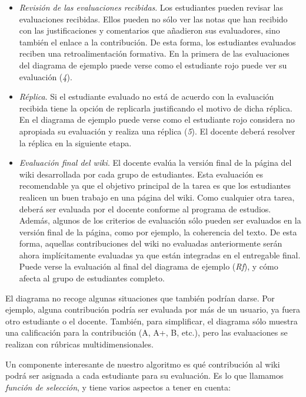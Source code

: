 \begin{itemize}
				\item \emph{Revisión de las evaluaciones recibidas}. Los estudiantes pueden revisar las evaluaciones recibidas. Ellos pueden no sólo ver las notas que han recibido con las justificaciones y comentarios que añadieron sus evaluadores, sino también el enlace a la contribución. De esta forma, los estudiantes evaluados reciben una retroalimentación formativa. En la primera de las evaluaciones del diagrama de ejemplo puede verse como el estudiante rojo puede ver su evaluación (\emph{4}).
				\item \emph{Réplica}. Si el estudiante evaluado no está de acuerdo con la evaluación recibida tiene la opción de replicarla justificando el motivo de dicha réplica. En el diagrama de ejemplo puede verse como el estudiante rojo considera no apropiada su evaluación y realiza una réplica (\emph{5}). El docente deberá resolver la réplica en la siguiente etapa.
				\item \emph{Evaluación final del wiki}. El docente evalúa la versión final de la página del wiki desarrollada por cada grupo de estudiantes. Esta evaluación es recomendable ya que el objetivo principal de la tarea es que los estudiantes realicen un buen trabajo en una página del wiki. Como cualquier otra tarea, deberá ser evaluada por el docente conforme al programa de estudios. Además, algunos de los criterios de evaluación sólo pueden ser evaluados en la versión final de la página, como por ejemplo, la coherencia del texto. De esta forma, aquellas contribuciones del wiki no evaluadas anteriormente serán ahora implícitamente evaluadas ya que están integradas en el entregable final. Puede verse la evaluación al final del diagrama de ejemplo (\emph{Rf}), y cómo afecta al grupo de estudiantes completo.
\end{itemize}

			El diagrama no recoge algunas situaciones que también podrían darse. Por ejemplo, alguna contribución podría ser evaluada por más de un usuario, ya fuera otro estudiante o el docente. También, para simplificar, el diagrama sólo muestra una calificación para la contribución (A, A+, B, etc.), pero las evaluaciones se realizan con rúbricas multidimensionales.

			Un componente interesante de nuestro algoritmo es qué contribución al wiki podrá ser asignada a cada estudiante para su evaluación. Es lo que llamamos \emph{función de selección}, y tiene varios aspectos a tener en cuenta:

